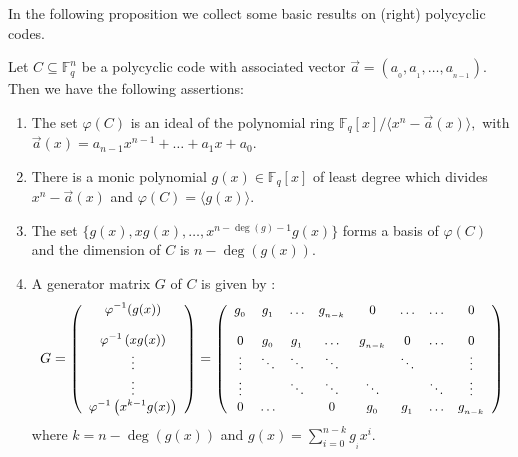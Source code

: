 \documentclass[12pt]{elsarticle}
\def\dsum #1#2{\displaystyle{\sum_{#1}^{#2}}}
\newcommand{\Fq}{\mathbb{F}_{q}}
\theoremstyle{break}
{\theorembodyfont{\upshape}
    \newtheorem{theorem}{Theorem}[section] %
    \newtheorem{lemma}[theorem]{Lemma} %
    \newtheorem{proposition}[theorem]{Proposition}
    \newtheorem{corollary}[theorem]{Corollary}
    \newtheorem{definition}[theorem]{Definition}
    \newtheorem{example}[theorem]{Example}
    \newtheorem{remark}[theorem]{Remark}
    \newtheorem{conjecture}[theorem]{Conjecture}
    \newtheorem*{proof}{{Proof}}
	\newtheorem*{notation}{Notation}
	\newtheorem*{main}{Cain Theorem}
	\newtheorem*{problem}{Problem}
}
\begin{document}
In the following proposition we collect some basic results on (right) polycyclic codes.
	\begin{proposition}\label{P2}
		Let $ C\subseteq \Fq^{n} $ be a polycyclic code with associated vector $\vec{a}=\left(a_{_0},a_{_1},\ldots, a_{_{n-1}}\right)$. Then we have the following assertions:
		\begin{enumerate}
		\item The set $ \varphi(C)$ is an ideal of the polynomial ring $\Fq[x]/\langle x^{n} - \vec{a}(x) \rangle, $ with $ \vec{a}(x)=a_{n-1}x^{n-1}+\ldots+a_1x+a_0.$
		\item There is a monic polynomial  $ g(x)\in \Fq[x]  $ of least degree which  divides $  x^{n} - \vec{a}(x) $ 
			and   $ \varphi(C)=\langle g(x)\rangle. $
			\item The set $ \{ g(x),xg(x),\ldots, x^{{n-\deg(g)-1}}g(x)\} $ forms a basis of $ \varphi(C) $ and the dimension of  $ C $ is $ n-\deg(g(x)). $
			\item A generator matrix $ G $ of $ C $ is given by :\\
			$$ G=\small{\left(\begin{array}{c}
			\varphi^{-1}(g(x)) \\ 
			\\
			\varphi^{-1}\left(xg(x)\right)\\ 
			\vdots \\
			\vdots\\
			\varphi^{-1}\left(x^{{k-1}}g(x)\right)
			\end{array} \right) =\left( \begin{array}{cccccccc}
			g_{_0} & g_{_1}  &  \ldots&g_{_{n-k}}& 0        &\ldots  & \ldots & 0 \\ 
			\\
			0      & g_{_0} &g_{_1}  &  \ldots  &g_{_{n-k}}& 0      & \ldots & 0  \\ 
			\vdots & \ddots & \ddots & \ddots   &          & \ddots &        & \vdots \\ 
			\vdots &        & \ddots & \ddots   & \ddots   &        & \ddots & \vdots  \\ 
			0      &\ldots &        &0         & g_{_0}   & g_{_1} & \ldots & g_{_{n-k}}   \\ 
			\end{array}  \right)}$$
		\noindent	where  $k=n-\deg(g(x))$ and $ g(x)=  \dsum{i=0}{n-k} g_{_i}x^{i}.$
				\end{enumerate}
		\end{proposition}
\end{document}
